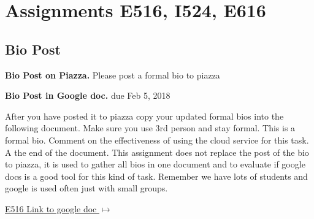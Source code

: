 \section{Assignments E516, I524, E616}
\label{s:616-assignments}

\subsection{Bio Post}\label{a:616-bio}

\begin{exercise}\label{E:616-bio-piazza}
{\bf Bio Post on Piazza.} Please post a formal bio to piazza
\end{exercise}

\begin{exercise}\label{E:616-bio-googledocs}

  {\bf Bio Post in Google doc.} due Feb 5, 2018
  
  After you have posted it to piazza
  copy your updated formal bios into the following document.  Make
  sure you use 3rd person and stay formal. This is a formal
  bio. Comment on the effectiveness of using the cloud service for
  this task. A the end of the document. This assignment does not
  replace the post of the bio to piazza, it is used to gather all bios
  in one document and to evaluate if google docs is a good tool for
  this kind of task. Remember we have lots of students and google is
  used often just with small groups.
 
 \smallskip

 {\hfill
   \href{https://docs.google.com/document/d/1ejzlKYqC3dLac8WXVpcPQsJh1j4BDqRxxgGg1cFQbeQ/edit?usp=sharing}{E516
     Link to google doc $\mapsto$}}


 \end{exercise}

